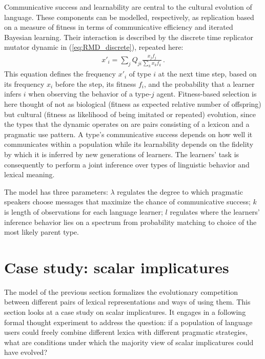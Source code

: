 \documentclass[a4paper, 11pt]{article}
\theoremstyle{Satz}
\begin{document}
Communicative success and learnability are central to the cultural evolution of language. These
components can be modelled, respectively, as replication based on a measure of fitness in terms
of communicative efficiency and iterated Bayesian learning. Their interaction is described by
the discrete time replicator mutator dynamic in (\ref{eq:RMD_discrete}), repeated here:
\begin{align*}
  x'_i = \sum_j Q_{ji} \frac{x_jf_j}{\sum_k x_k f_k}\,.
\end{align*}
This equation defines the frequency $x'_i$ of type $i$ at the next time step, based on its
frequency $x_i$ before the step, its fitness $f_i$, and the probability that a learner infers
$i$ when observing the behavior of a type-$j$ agent. Fitness-based selection is here thought of
not as biological (fitness as expected relative number of offspring) but cultural (fitness as
likelihood of being imitated or repeated) evolution, since the types that the dynamic operates
on are pairs consisting of a lexicon and a pragmatic use pattern. A type's communicative success depends
on how well it communicates within a population while its learnability depends on the
fidelity by which it is inferred by new generations of learners. The learners' task is
consequently to perform a joint inference over types of linguistic behavior and lexical
meaning.

The model has three parameters: $\lambda$ regulates the degree to which pragmatic speakers
choose messages that maximize the chance of communicative success; $k$ is length of
observations for each language learner; $l$ regulates where the learners' inference behavior
lies on a spectrum from probability matching to choice of the most likely parent type.


\section{Case study: scalar implicatures}
\label{sec:si-case-study}

The model of the previous section formalizes the evolutionary competition between different
pairs of lexical representations and ways of using them. This section looks at a case study on scalar
implicatures. It engages in a following formal thought experiment to address the question: if a
population of language users could freely combine different lexica with different pragmatic
strategies, what are conditions under which the majority view of scalar implicatures could have
evolved?
\end{document}
